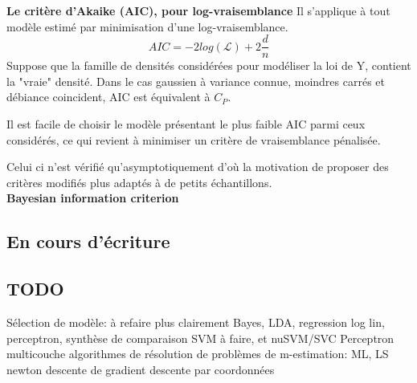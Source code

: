 \documentclass[a4paper]{article}
\theoremstyle{plain}
\begin{document}
\textbf{Le critère d'Akaike (AIC), pour log-vraisemblance}
Il s'applique à tout modèle estimé par minimisation d'une log-vraisemblance.
$$ AIC = -2 log(\mathcal{L})+2\frac{d}{n}$$
Suppose que la famille de densités considérées pour modéliser la loi de Y, contient la "vraie" densité. Dans le cas gaussien à variance connue, moindres carrés et débiance coincident, AIC est équivalent à $C_P$.

Il est facile de choisir le modèle présentant le plus faible AIC parmi ceux considérés, ce qui revient à minimiser un critère de vraisemblance pénalisée.

Celui ci n'est vérifié qu'asymptotiquement d'où la motivation de proposer des critères modifiés plus adaptés à de petits échantillons.\\

\textbf{Bayesian information criterion}

\subsection{En cours d'écriture}


\subsection{TODO}

\begin{outline}
\1 Sélection de modèle: à refaire plus clairement
\1 Bayes, LDA, regression log lin, perceptron, synthèse de comparaison
\1 SVM à faire, et nuSVM/SVC
\1 Perceptron multicouche
\1 algorithmes de résolution de problèmes de m-estimation: ML, LS
\2 newton
\2 descente de gradient
\2 descente par coordonnées
\end{outline}


\end{document}
